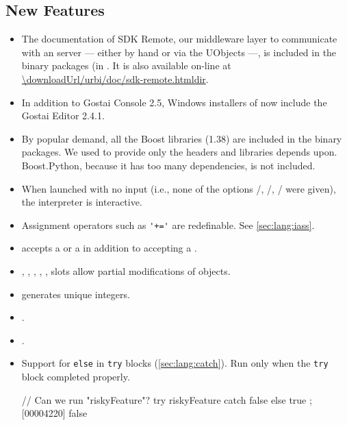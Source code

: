 \subsection{New Features}
\begin{itemize}
\item The documentation of \urbi SDK Remote, our middleware layer to
  communicate with an \urbi server --- either by hand or via the UObjects
  ---, is included in the binary packages (in
  .  It is also
  available on-line at
  \url{\downloadUrl/urbi/doc/sdk-remote.htmldir}.

\item In addition to Gostai Console 2.5, Windows installers of \usdk now
  include the Gostai Editor 2.4.1.

\item By popular demand, all the Boost libraries (1.38) are included in the
  binary packages.  We used to provide only the headers and libraries \usdk
  depends upon.  Boost.Python, because it has too many dependencies, is not
  included.

\item When launched with no input (i.e., none of the options
  /, /,
  / were given), the interpreter is interactive.

\item Assignment operators such as \lstinline|'+='| are redefinable.  See
  \autoref{sec:lang:iass}.

\item {} accepts a  or a
   in addition to accepting a .

\item {}, , ,
  , , 
  slots allow partial modifications of  objects.

\item {} generates unique integers.

\item {}.

\item {}.

\item Support for \lstinline|else| in \lstinline|try| blocks
  (\autoref{sec:lang:catch}).  Run only when the \lstinline|try|
  block completed properly.
\begin{urbiscript}
// Can we run "riskyFeature"?
try { riskyFeature } catch { false } else { true };
[00004220] false


\end{urbiscript}
\end{itemize}
